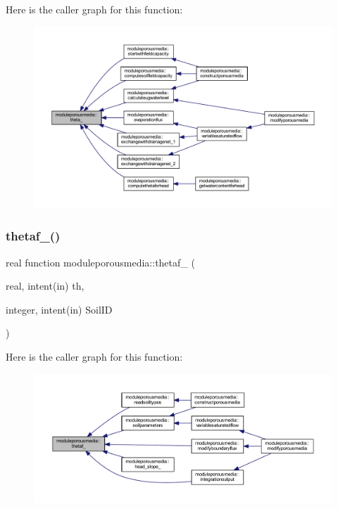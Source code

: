 Here is the caller graph for this function\+:\nopagebreak
\begin{figure}[H]
\begin{center}
\leavevmode
\includegraphics[width=350pt]{namespacemoduleporousmedia_a61fe4c9d6a8bf021bfbb5ae3ba5e548e_icgraph}
\end{center}
\end{figure}
\mbox{\label{namespacemoduleporousmedia_ada12066e158a338a6444954f0da815e1}} 
\subsubsection{\texorpdfstring{thetaf\+\_\+()}{thetaf\_()}}
{\footnotesize\ttfamily real function moduleporousmedia\+::thetaf\+\_\+ (\begin{DoxyParamCaption}\item[{real, intent(in)}]{th,  }\item[{integer, intent(in)}]{Soil\+ID }\end{DoxyParamCaption})\hspace{0.3cm}{\ttfamily [private]}}

Here is the caller graph for this function\+:\nopagebreak
\begin{figure}[H]
\begin{center}
\leavevmode
\includegraphics[width=350pt]{namespacemoduleporousmedia_ada12066e158a338a6444954f0da815e1_icgraph}
\end{center}
\end{figure}
\mbox{\label{namespacemoduleporousmedia_ad36e11e27240926924cf03325b9a47bc}} 
